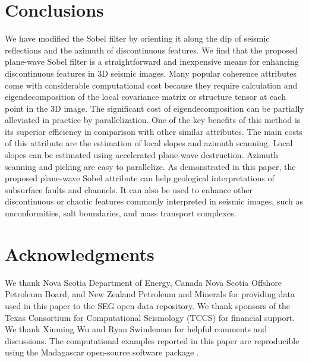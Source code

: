 \section{Conclusions}
We have modified the Sobel filter by orienting it along the dip of seismic reflections and the azimuth of discontinuous features.
We find that the proposed plane-wave Sobel filter is a straightforward and inexpensive means for enhancing discontinuous features in 3{D} seismic images. 
Many popular coherence attributes come with considerable computational cost because they require calculation and eigendecomposition of the local covariance matrix or structure tensor at each point in the 3{D} image.
The significant cost of eigendecomposition can be partially alleviated in practice by parallelization.
One of the key benefits of this method is its superior efficiency in comparison with other similar attributes.
The main costs of this attribute are the estimation of local slopes and azimuth scanning.
Local slopes can be estimated using accelerated plane-wave destruction.
Azimuth scanning and picking are easy to parallelize.
As demonstrated in this paper, the proposed plane-wave Sobel attribute can help geological interpretations of subsurface faults and channels.
It can also be used to enhance other discontinuous or chaotic features commonly interpreted in seismic images, such as unconformities, salt boundaries, and mass transport complexes.

\section{Acknowledgments}
We thank Nova Scotia Department of Energy, Canada Nova Scotia Offshore Petroleum Board, and New Zealand Petroleum and Minerals for providing data used in this paper to the SEG open data repository.
We thank sponsors of the Texas Consortium for Computational Seismology (TCCS) for financial support.
We thank Xinming Wu and Ryan Swindeman for helpful comments and discussions.
The computational examples reported in this paper are reproducible using the Madagascar open-source software package \cite[]{fomel13}.



